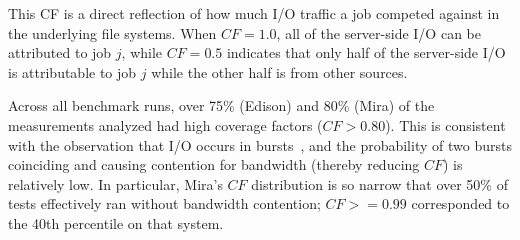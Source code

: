 This CF is a direct reflection of how much I/O traffic a job competed against in the underlying file systems.
When $\mathit{CF} = 1.0$, all of the server-side I/O can be attributed to job $j$, while $\mathit{CF} = 0.5$ indicates that only half of the server-side I/O is attributable to job $j$ while the other half is from other sources.



Across all benchmark runs, over 75\% (Edison) and 80\% (Mira) of the measurements analyzed had high coverage factors ($\mathit{CF} > 0.80$).
This is consistent with the observation that I/O occurs in bursts~\cite{Carns2011,Liu2016}, and the probability of two bursts coinciding and causing contention for bandwidth (thereby reducing $\mathit{CF}$) is relatively low.
In particular, Mira's $\mathit{CF}$ distribution is so narrow that over 50\% of tests effectively ran without bandwidth contention; $\mathit{CF} >= 0.99$ corresponded to the 40th percentile on that system.


